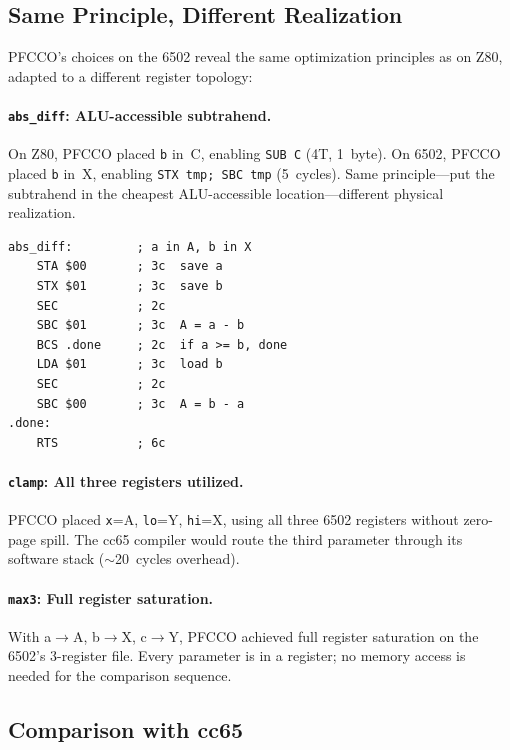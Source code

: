 \documentclass[sigplan,screen,nonacm]{acmart}
\begin{document}
\subsection{Same Principle, Different Realization}

PFCCO's choices on the 6502 reveal the same optimization principles as on
Z80, adapted to a different register topology:

\paragraph{\texttt{abs\_diff}: ALU-accessible subtrahend.}
On Z80, PFCCO placed \texttt{b} in~C, enabling \texttt{SUB~C} (4T,
1~byte).  On 6502, PFCCO placed \texttt{b} in~X, enabling \texttt{STX~tmp;
SBC~tmp} (5~cycles).  Same principle---put the subtrahend in the cheapest
ALU-accessible location---different physical realization.

\begin{lstlisting}[language=m6502asm,caption={6502 \texttt{abs\_diff}
  (PFCCO: a=A, b=X).}]
abs_diff:         ; a in A, b in X
    STA $00       ; 3c  save a
    STX $01       ; 3c  save b
    SEC           ; 2c
    SBC $01       ; 3c  A = a - b
    BCS .done     ; 2c  if a >= b, done
    LDA $01       ; 3c  load b
    SEC           ; 2c
    SBC $00       ; 3c  A = b - a
.done:
    RTS           ; 6c
\end{lstlisting}

\paragraph{\texttt{clamp}: All three registers utilized.}
PFCCO placed \texttt{x}=A, \texttt{lo}=Y, \texttt{hi}=X, using all three
6502 registers without zero-page spill.  The cc65 compiler would route the
third parameter through its software stack ($\sim$20~cycles overhead).

\paragraph{\texttt{max3}: Full register saturation.}
With a$\to$A, b$\to$X, c$\to$Y, PFCCO achieved full register saturation
on the 6502's 3-register file.  Every parameter is in a register; no
memory access is needed for the comparison sequence.

\subsection{Comparison with cc65}
\end{document}
